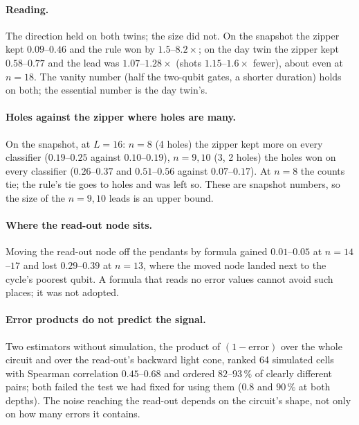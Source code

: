 \documentclass[11pt]{article}
\begin{document}
\paragraph{Reading.} The direction held on both twins; the size did not. On the snapshot the zipper kept $0.09$--$0.46$
and the rule won by $1.5$--$8.2\times$; on the day twin the zipper kept $0.58$--$0.77$ and the lead was
$1.07$--$1.28\times$ (shots $1.15$--$1.6\times$ fewer), about even at $n=18$. The vanity number (half the two-qubit gates, a shorter duration) holds on
both; the essential number is the day twin's.

\paragraph{Holes against the zipper where holes are many.} On the snapshot, at $L=16$: $n = 8$ (4 holes) the zipper kept
more on every classifier ($0.19$--$0.25$ against $0.10$--$0.19$), $n = 9, 10$ (3, 2 holes) the holes won on every
classifier ($0.26$--$0.37$ and $0.51$--$0.56$ against $0.07$--$0.17$). At $n=8$ the counts tie; the rule's tie goes to
holes and was left so. These are snapshot numbers, so the size of the $n = 9, 10$ leads is an upper bound.

\paragraph{Where the read-out node sits.} Moving the read-out node off the pendants by formula gained $0.01$--$0.05$ at
$n = 14$--$17$ and lost $0.29$--$0.39$ at $n=13$, where the moved node landed next to the cycle's poorest qubit. A
formula that reads no error values cannot avoid such places; it was not adopted.

\paragraph{Error products do not predict the signal.} Two estimators without simulation, the product of $(1-\text{error})$ over
the whole circuit and over the read-out's backward light cone, ranked 64 simulated cells with Spearman correlation
$0.45$--$0.68$ and ordered $82$--$93\,\%$ of clearly different pairs; both failed the test we had fixed for using them
($0.8$ and $90\,\%$ at both depths). The noise reaching the read-out depends on the circuit's shape, not only on how many
errors it contains.
\end{document}
